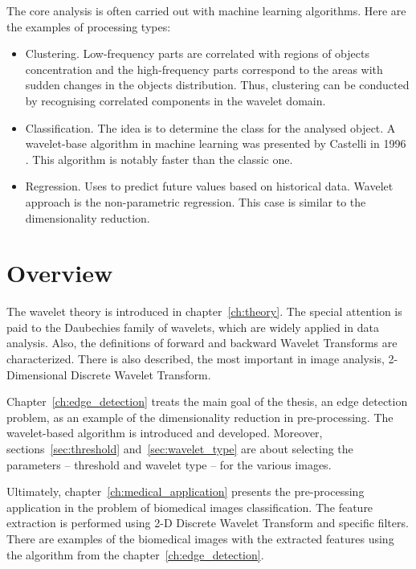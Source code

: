 \noindent The core analysis is often carried out with machine learning algorithms. Here are the examples of processing types:
\begin{itemize}
\item Clustering. Low-frequency parts are correlated with regions of objects concentration and the high-frequency parts correspond to the areas with sudden changes in the objects distribution. Thus, clustering can be conducted by recognising correlated components in the wavelet domain.

\item Classification. The idea is to determine the class for the analysed object. A wavelet-base algorithm in machine learning was presented by Castelli in 1996 \cite{castelli}. This algorithm is notably faster than the classic one.

\item Regression. Uses to predict future values based on historical data. Wavelet approach is the non-parametric regression. This case is similar to the dimensionality reduction.

\end{itemize}

\section*{Overview}
The wavelet theory is introduced in chapter~\ref{ch:theory}. The special attention is paid to the Daubechies family of wavelets, which are widely applied in data analysis. Also, the definitions of forward and backward Wavelet Transforms are characterized. There is also described, the most important in image analysis, 2-Dimensional Discrete Wavelet Transform.

Chapter~\ref{ch:edge_detection} treats the main goal of the thesis, an edge detection problem, as an example of the dimensionality reduction in pre-processing. The wavelet-based algorithm is introduced and developed. Moreover, sections~\ref{sec:threshold} and~\ref{sec:wavelet_type} are about selecting the parameters -- threshold and wavelet type -- for the various images.

Ultimately, chapter~\ref{ch:medical_application} presents the pre-processing application in the problem of biomedical images classification. The feature extraction is performed using 2-D Discrete Wavelet Transform and specific filters. There are examples of the biomedical images with the extracted features using the algorithm from the chapter~\ref{ch:edge_detection}.





